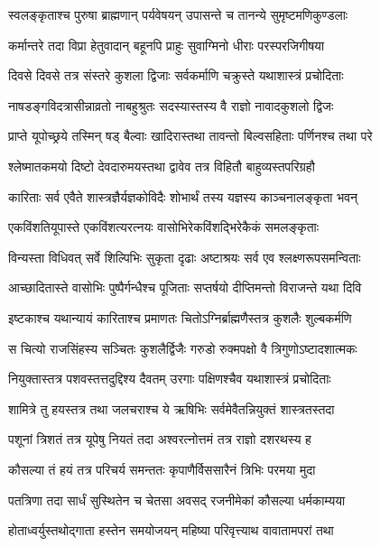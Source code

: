 \twolineshloka
{स्वलङ्कृताश्च पुरुषा ब्राह्मणान् पर्यवेषयन्}
{उपासन्ते च तानन्ये सुमृष्टमणिकुण्डलाः} %

\twolineshloka
{कर्मान्तरे तदा विप्रा हेतुवादान् बहूनपि}
{प्राहुः सुवाग्मिनो धीराः परस्परजिगीषया} %

\twolineshloka
{दिवसे दिवसे तत्र संस्तरे कुशला द्विजाः}
{सर्वकर्माणि चक्रुस्ते यथाशास्त्रं प्रचोदिताः} %

\twolineshloka
{नाषडङ्गविदत्रासीन्नाव्रतो नाबहुश्रुतः}
{सदस्यास्तस्य वै राज्ञो नावादकुशलो द्विजः} %

\twolineshloka
{प्राप्ते यूपोच्छ्रये तस्मिन् षड् बैल्वाः खादिरास्तथा}
{तावन्तो बिल्वसहिताः पर्णिनश्च तथा परे} %

\twolineshloka
{श्लेष्मातकमयो दिष्टो देवदारुमयस्तथा}
{द्वावेव तत्र विहितौ बाहुव्यस्तपरिग्रहौ} %

\twolineshloka
{कारिताः सर्व एवैते शास्त्रज्ञैर्यज्ञकोविदैः}
{शोभार्थं तस्य यज्ञस्य काञ्चनालङ्कृता भवन्} %

\twolineshloka
{एकविंशतियूपास्ते एकविंशत्यरत्नयः}
{वासोभिरेकविंशद्भिरेकैकं समलङ्कृताः} %

\twolineshloka
{विन्यस्ता विधिवत् सर्वे शिल्पिभिः सुकृता दृढाः}
{अष्टाश्रयः सर्व एव श्लक्ष्णरूपसमन्विताः} %

\twolineshloka
{आच्छादितास्ते वासोभिः पुष्पैर्गन्धैश्च पूजिताः}
{सप्तर्षयो दीप्तिमन्तो विराजन्ते यथा दिवि} %

\twolineshloka
{इष्टकाश्च यथान्यायं कारिताश्च प्रमाणतः}
{चितोऽग्निर्ब्राह्मणैस्तत्र कुशलैः शुल्बकर्मणि} %

\twolineshloka
{स चित्यो राजसिंहस्य सञ्चितः कुशलैर्द्विजैः}
{गरुडो रुक्मपक्षो वै त्रिगुणोऽष्टादशात्मकः} %

\twolineshloka
{नियुक्तास्तत्र पशवस्तत्तदुद्दिश्य दैवतम्}
{उरगाः पक्षिणश्चैव यथाशास्त्रं प्रचोदिताः} %

\twolineshloka
{शामित्रे तु हयस्तत्र तथा जलचराश्च ये}
{ऋषिभिः सर्वमेवैतन्नियुक्तं शास्त्रतस्तदा} %

\twolineshloka
{पशूनां त्रिशतं तत्र यूपेषु नियतं तदा}
{अश्वरत्नोत्तमं तत्र राज्ञो दशरथस्य ह} %

\twolineshloka
{कौसल्या तं हयं तत्र परिचर्य समन्ततः}
{कृपाणैर्विससारैनं त्रिभिः परमया मुदा} %

\twolineshloka
{पतत्रिणा तदा सार्धं सुस्थितेन च चेतसा}
{अवसद् रजनीमेकां कौसल्या धर्मकाम्यया} %

\twolineshloka
{होताध्वर्युस्तथोद्गाता हस्तेन समयोजयन्}
{महिष्या परिवृत्त्याथ वावातामपरां तथा} %

